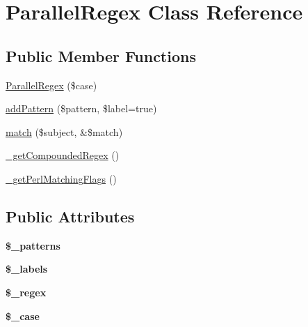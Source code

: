 \hypertarget{class_parallel_regex}{
\section{ParallelRegex Class Reference}
\label{class_parallel_regex}
}
\subsection*{Public Member Functions}
\begin{DoxyCompactItemize}
\item 
\hyperlink{class_parallel_regex_aea7360b4e60f1bfa202a51baf873a950}{ParallelRegex} (\$case)
\item 
\hyperlink{class_parallel_regex_a7746a3442c21025ad395300b08d59b4a}{addPattern} (\$pattern, \$label=true)
\item 
\hyperlink{class_parallel_regex_adfb969c27ae72a68ad84aeacbee0f873}{match} (\$subject, \&\$match)
\item 
\hyperlink{class_parallel_regex_a044eace36cdc60c0b26466adc7da62ea}{\_\-getCompoundedRegex} ()
\item 
\hyperlink{class_parallel_regex_a23bcc05b9a3a5c2050c3156a3ffc2c52}{\_\-getPerlMatchingFlags} ()
\end{DoxyCompactItemize}
\subsection*{Public Attributes}
\begin{DoxyCompactItemize}
\item 
\hypertarget{class_parallel_regex_a34473375c11f5895d1a37db5c6c041b9}{
{\bfseries \$\_\-patterns}}
\label{class_parallel_regex_a34473375c11f5895d1a37db5c6c041b9}

\item 
\hypertarget{class_parallel_regex_a087c52c4c3b44fe30f815e7b3d87da00}{
{\bfseries \$\_\-labels}}
\label{class_parallel_regex_a087c52c4c3b44fe30f815e7b3d87da00}

\item 
\hypertarget{class_parallel_regex_a5c6d2b30fd40c475cffc68323282bb82}{
{\bfseries \$\_\-regex}}
\label{class_parallel_regex_a5c6d2b30fd40c475cffc68323282bb82}

\item 
\hypertarget{class_parallel_regex_ac546769988c7e3d9f4563d0f8f9e9426}{
{\bfseries \$\_\-case}}
\label{class_parallel_regex_ac546769988c7e3d9f4563d0f8f9e9426}

\end{DoxyCompactItemize}


